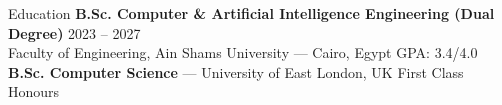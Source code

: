 \begin{rSection}{Education}
	{\bf B.Sc. Computer \& Artificial Intelligence Engineering (Dual Degree)} \hfill {2023 -- 2027}\\
	Faculty of Engineering, Ain Shams University --- Cairo, Egypt \hfill GPA: 3.4/4.0\vspace{-4mm}\\

	{\bf B.Sc. Computer Science} --- University of East London, UK \hfill First Class Honours
\end{rSection}